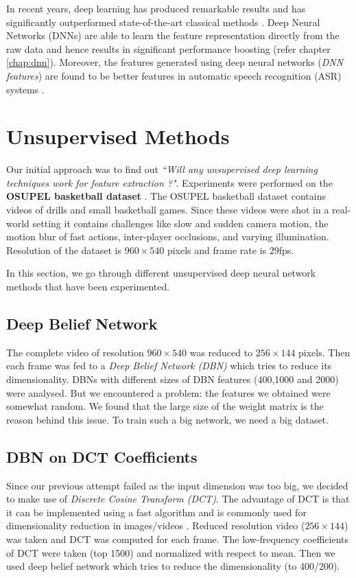 In recent years, deep learning has produced remarkable results and has significantly outperformed state-of-the-art classical methods \cite{KarpathyCVPR14}.  Deep Neural Networks (DNNs) are able to learn the feature representation directly from the raw data and hence results in significant performance boosting (refer chapter \ref{chap:dnn}).  Moreover, the features generated using deep neural networks (\textit{DNN features}) are found to be better features in automatic speech recognition (ASR) systems \cite{yu2011improved,gehring2013extracting}.

\section{Unsupervised Methods}
\label{sec:event:unsupervised}
Our initial approach was to find out \textit{``Will any unsupervised deep learning techniques work for feature extraction ?"}.  Experiments were performed on the \textbf{OSUPEL basketball dataset} \cite{brendel2011probabilistic}.  The OSUPEL basketball dataset contains videos of drills and small basketball games.  Since these videos were shot in a real-world setting it contains challenges like slow and sudden camera motion, the motion blur of fast actions, inter-player occlusions, and varying illumination.  Resolution of the dataset is $960 \times 540$ pixels and frame rate is $29$fps.

In this section, we go through different unsupervised deep neural network methods that have been experimented.

\subsection{Deep Belief Network} 
The complete video of resolution $960 \times 540$ was reduced to $256 \times 144$ pixels.  Then each frame was fed to a \textit{Deep Belief Network (DBN)} which tries to reduce its dimensionality.  DBNs with different sizes of DBN features (400,1000 and 2000) were analysed.  But we encountered a problem: the features we obtained were somewhat random.  We found that the large size of the weight matrix is the reason behind this issue.  To train such a big network, we need a big dataset.

\subsection{DBN on DCT Coefficients}
Since our previous attempt failed as the input dimension was too big, we decided to make use of \textit{Discrete Cosine Transform (DCT)}.  The advantage of DCT is that it can be implemented using a fast algorithm and is commonly used for dimensionality reduction in images/videos \cite{er2005high}.  Reduced resolution video ($256 \times 144$) was taken and DCT was computed for each frame.  The low-frequency coefficients of DCT were taken (top 1500) and normalized with respect to mean.  Then we used deep belief network which tries to reduce the dimensionality (to 400/200).

